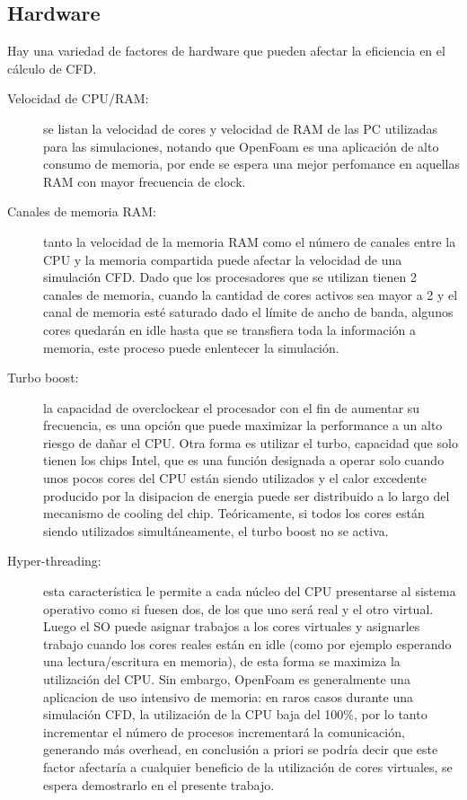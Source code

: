 \documentclass{article}
\begin{document}
\subsection{Hardware}
Hay una variedad de factores de hardware que pueden afectar la eficiencia en el cálculo de CFD.
\begin{description}
    \item [Velocidad de CPU/RAM:] se listan la velocidad de cores y velocidad de RAM de las PC utilizadas para las simulaciones, notando que OpenFoam es una aplicación de alto consumo de memoria, por ende se espera una mejor perfomance en aquellas RAM con mayor frecuencia de clock.
    \item [Canales de memoria RAM:] tanto la velocidad de la memoria RAM como el número de canales entre la CPU y la memoria compartida puede afectar la velocidad de una simulación CFD. Dado que los procesadores que se utilizan tienen 2 canales de memoria, cuando la cantidad de cores activos sea mayor a 2 y el canal de memoria esté saturado dado el límite de ancho de banda, algunos cores quedarán en idle hasta que se transfiera toda la información a memoria, este proceso puede enlentecer la simulación.
    \item [Turbo boost:] la capacidad de overclockear el procesador con el fin de aumentar su frecuencia, es una  opción que puede maximizar la performance a un alto riesgo de dañar el CPU. Otra forma es utilizar el turbo, capacidad que solo tienen los chips Intel, que es una función designada a operar solo cuando unos pocos cores del CPU están siendo utilizados y el calor excedente producido por la disipacion de energia puede ser distribuido a lo largo del mecanismo de cooling del chip. Teóricamente, si todos los cores están siendo utilizados simultáneamente, el turbo boost no se activa.
    \item [Hyper-threading:] esta característica le permite a cada núcleo del CPU presentarse al sistema operativo como si fuesen dos, de los que uno será real y el otro virtual. Luego el SO puede asignar trabajos a los cores virtuales y asignarles trabajo cuando los cores reales están en idle (como por ejemplo esperando una lectura/escritura en memoria), de esta forma se maximiza la utilización del CPU. Sin embargo, OpenFoam es generalmente una aplicacion de uso intensivo de memoria: en raros casos durante una simulación CFD, la utilización de la CPU baja del 100\%, por lo tanto incrementar el número de procesos incrementará la comunicación, generando más overhead, en conclusión a priori se podría decir que este factor afectaría a cualquier beneficio de la utilización de cores virtuales, se espera demostrarlo en el presente trabajo.
\end{description}
\end{document}
